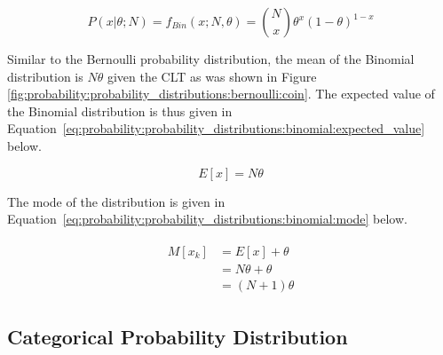 \begin{equation}
      \label{eq:probability:probability_distributions:binomial:pmf}
      P(x \vert \theta; N) = f_{Bin}(x; N, \theta) = \binom{N}{x} \theta^{x}(1-\theta)^{1-x}
\end{equation}

\noindent
Similar to the Bernoulli probability distribution, the mean of the Binomial distribution is $N\theta$ given the \acs{CLT} as was shown in Figure \ref{fig:probability:probability_distributions:bernoulli:coin}. The expected value of the Binomial distribution is thus given in Equation~\eqref{eq:probability:probability_distributions:binomial:expected_value} below.

\begin{equation}
      \label{eq:probability:probability_distributions:binomial:expected_value}
      E[x] = N\theta
\end{equation}

\noindent
The mode of the distribution is given in Equation~\eqref{eq:probability:probability_distributions:binomial:mode} below.

\begin{align}
      \label{eq:probability:probability_distributions:binomial:mode}
      \begin{split}
            M[x_{k}] &= E[x] + \theta \\
            &= N\theta  + \theta \\
            &= (N  + 1)\theta
      \end{split}
\end{align}



\subsection{Categorical Probability Distribution}\label{sec:probability:probability_distributions:categorical}

